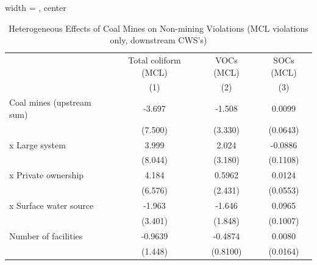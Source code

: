 
\begin{table}[htbp]
   
   \caption{\label{tab:2sls_het_unified_nonminevio_ivsum_mcl} Heterogeneous Effects of Coal Mines on Non-mining Violations (MCL violations only, downstream CWS's)}
   \bigskip
   
   \centering
   
   \begin{adjustbox}{width = \textwidth, center}
      
      
      \begin{tabular}{lccc}
         \toprule
         
                                                       & Total coliform (MCL) & VOCs (MCL)    & SOCs (MCL)\\  
         
                                                       & (1)                  & (2)           & (3)\\  
         
         \midrule 
         Coal mines (upstream sum)                     & -3.697               & -1.508        & 0.0099\\   
                                                       & (7.500)              & (3.330)       & (0.0643)\\   
           x Large system                              & 3.999                & 2.024         & -0.0886\\   
                                                       & (8.044)              & (3.180)       & (0.1108)\\   
           x Private ownership                         & 4.184                & 0.5962        & 0.0124\\   
                                                       & (6.576)              & (2.431)       & (0.0553)\\   
           x Surface water source                      & -1.963               & -1.646        & 0.0965\\   
                                                       & (3.401)              & (1.848)       & (0.1007)\\   
         Number of facilities                          & -0.9639              & -0.4874       & 0.0080\\   
                                                       & (1.448)              & (0.8100)      & (0.0164)\\   
         

\end{tabular}
\end{adjustbox}
\end{table}
